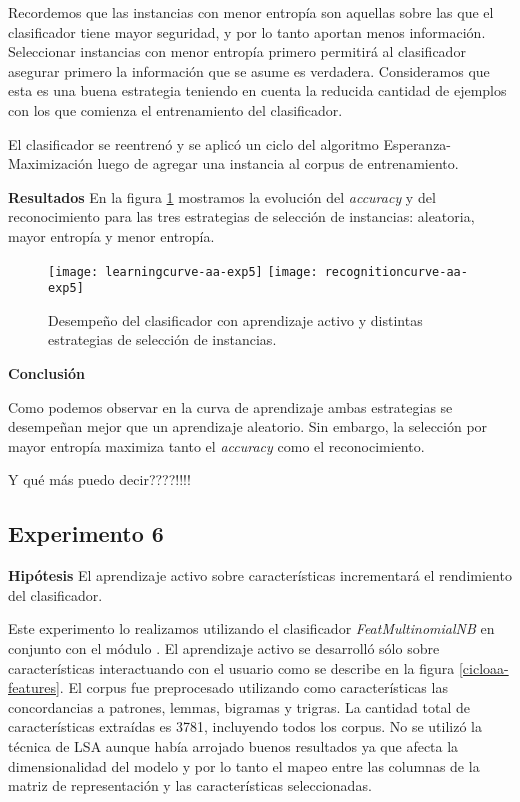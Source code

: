 Recordemos que las instancias con menor entropía son aquellas sobre las que el clasificador tiene mayor seguridad, y por lo tanto aportan menos información. Seleccionar instancias con menor entropía primero permitirá al clasificador asegurar primero la información que se asume es verdadera. Consideramos que esta es una buena estrategia teniendo en cuenta la reducida cantidad de ejemplos con los que comienza el entrenamiento del clasificador.

El clasificador se reentrenó y se aplicó un ciclo del algoritmo Esperanza-Maximización luego de agregar una instancia al corpus de entrenamiento.

\vspace{3 mm}

\textbf{Resultados} En la figura \ref{fig-aa-comparision} mostramos la evolución del \textit{accuracy} y del reconocimiento para las tres estrategias de selección de instancias: aleatoria, mayor entropía y menor entropía.

\begin{figure}[h!]\label{fig-aa-comparision}
\centering
\texttt{[image: learningcurve-aa-exp5]}
\texttt{[image: recognitioncurve-aa-exp5]}
\caption{Desempeño del clasificador con aprendizaje activo y distintas estrategias de selección de instancias.}
\end{figure}


\vspace{3 mm}

\textbf{Conclusión}

Como podemos observar en la curva de aprendizaje ambas estrategias se desempeñan mejor que un aprendizaje aleatorio. Sin embargo, la selección por mayor entropía maximiza tanto el \textit{accuracy} como el reconocimiento.

Y qué más puedo decir????!!!!

\subsection{Experimento 6}
\vspace{3 mm}
\textbf{Hipótesis} El aprendizaje activo sobre características incrementará el rendimiento del clasificador.
\vspace{3 mm}

Este experimento lo realizamos utilizando el clasificador \textit{FeatMultinomialNB} en conjunto con el módulo . El aprendizaje activo se desarrolló sólo sobre características interactuando con el usuario como se describe en la figura \ref{cicloaa-features}.
El corpus fue preprocesado utilizando como características las concordancias a patrones, lemmas, bigramas y trigras. La cantidad total de características extraídas es 3781, incluyendo todos los corpus. No se utilizó la técnica de LSA aunque había arrojado buenos resultados ya que afecta la dimensionalidad del modelo y por lo tanto el mapeo entre las columnas de la matriz de representación y las características seleccionadas.

